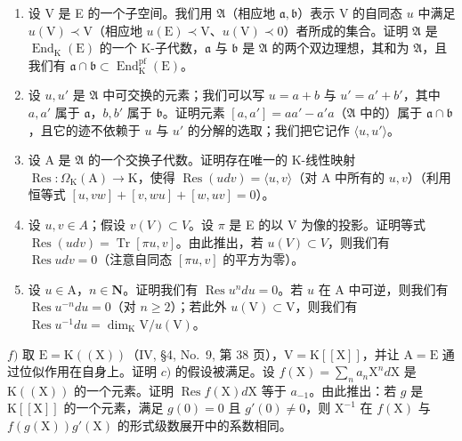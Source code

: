 \begin{enumerate}
\def\labelenumi{\alph{enumi})}
\item
  设 V 是 E 的一个子空间。我们用 \(\mathfrak{A}\)（相应地 \(\mathfrak{a},\mathfrak{b}\)）表示 V 的自同态 \(u\) 中满足 \(u(\mathrm{V})\prec \mathrm{V}\)（相应地 \(u(\mathrm{E})\prec \mathrm{V}\)、\(u(\mathrm{V})\prec 0\)）者所成的集合。证明 \(\mathfrak{A}\) 是 \(\operatorname{End}_{\mathrm{K}}(\mathrm{E})\) 的一个 K-子代数，\(\mathfrak{a}\) 与 \(\mathfrak{b}\) 是 \(\mathfrak{A}\) 的两个双边理想，其和为 \(\mathfrak{A}\)，且我们有 \(\mathfrak{a} \cap \mathfrak{b} \subset \operatorname{End}_{\mathrm{K}}^{\mathrm{pf}}(\mathrm{E})\)。
\item
  设 \(u, u'\) 是 \(\mathfrak{A}\) 中可交换的元素；我们可以写 \(u = a + b\) 与 \(u' = a' + b'\)，其中 \(a, a'\) 属于 \(\mathfrak{a}\)，\(b, b'\) 属于 \(\mathfrak{b}\)。证明元素 \([a, a'] = aa' - a'a\)（\(\mathfrak{A}\) 中的）属于 \(\mathfrak{a} \cap \mathfrak{b}\)，且它的迹不依赖于 \(u\) 与 \(u'\) 的分解的选取；我们把它记作 \(\langle u, u' \rangle\)。
\item
  设 A 是 \(\mathfrak{A}\) 的一个交换子代数。证明存在唯一的 K-线性映射 \(\operatorname{Res}:\Omega_{\mathrm{K}}(\mathrm{A})\to \mathrm{K}\)，使得 \(\operatorname{Res}(udv) = \langle u,v\rangle\)（对 A 中所有的 \(u,v\)）（利用恒等式 \([u,vw] + [v,wu] + [w,uv] = 0\)）。
\item
  设 \(u, v \in A\)；假设 \(v(V) \subset V\)。设 \(\pi\) 是 E 的以 V 为像的投影。证明等式 \(\operatorname{Res}(u dv) = \operatorname{Tr}[\pi u, v]\)。由此推出，若 \(u(V) \subset V\)，则我们有 \(\operatorname{Res} u dv = 0\)（注意自同态 \([\pi u, v]\) 的平方为零）。
\item
  设 \(u \in \mathrm{A}\)，\(n \in \mathbf{N}\)。证明我们有 \(\operatorname{Res} u^n du = 0\)。若 \(u\) 在 \(\mathrm{A}\) 中可逆，则我们有 \(\operatorname{Res} u^{-n} du = 0\)（对 \(n \geqslant 2\)）；若此外 \(u(\mathrm{V}) \subset \mathrm{V}\)，则我们有 \(\operatorname{Res} u^{-1} du = \dim_{\mathrm{K}} \mathrm{V} / u(\mathrm{V})\)。
\end{enumerate}

\(f)\) 取 \(\mathrm{E} = \mathrm{K}((\mathrm{X}))\)（IV, §4, No.~9, 第 38 页），\(\mathrm{V} = \mathrm{K}[[\mathrm{X}]]\)，并让 \(\mathrm{A} = \mathrm{E}\) 通过位似作用在自身上。证明 \(c)\) 的假设被满足。设 \(f(\mathrm{X}) = \sum_{n} a_{n} \mathrm{X}^{n} d\mathrm{X}\) 是 \(\mathrm{K}((\mathrm{X}))\) 的一个元素。证明 \(\operatorname{Res} f(\mathrm{X}) d\mathrm{X}\) 等于 \(a_{-1}\)。由此推出：若 \(g\) 是 \(\mathrm{K}[[\mathrm{X}]]\) 的一个元素，满足 \(g(0) = 0\) 且 \(g'(0) \neq 0\)，则 \(\mathrm{X}^{-1}\) 在 \(f(\mathrm{X})\) 与 \(f(g(\mathrm{X})) g'( \mathrm{X})\) 的形式级数展开中的系数相同。

